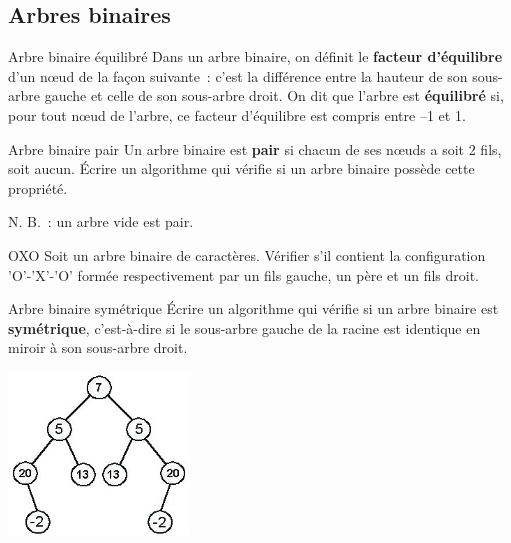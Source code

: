 	\subsection{Arbres binaires}

		\begin{Exercice}{Arbre binaire équilibré}
			Dans un arbre binaire, on définit le \textbf{facteur d'équilibre} 
			d'un n{\oe}ud de la façon suivante~: c'est la différence entre 
			la hauteur de son sous-arbre gauche et celle de son sous-arbre droit. 
			On dit que l'arbre est \textbf{équilibré} si, pour tout n{\oe}ud 
			de l'arbre, ce facteur d'équilibre est compris entre --1 et 1.
		\end{Exercice}
		
		\begin{Exercice}{Arbre binaire pair}
			Un arbre binaire est \textbf{pair} si chacun de ses n{\oe}uds 
			a soit 2 fils, soit aucun. Écrire un algorithme qui
			vérifie si un arbre binaire possède cette propriété. 
			
			N. B.~: un arbre vide est pair.
		\end{Exercice}
		
		\begin{Exercice}{OXO}
			Soit un arbre binaire de caractères. Vérifier s'il contient 
			la configuration 'O'-'X'-'O' formée respectivement par un
			fils gauche, un père et un fils droit.
		\end{Exercice}

		\begin{Exercice}{Arbre binaire symétrique}
			Écrire un algorithme qui vérifie si un arbre binaire est 
			\textbf{symétrique}, c'est-à-dire si le sous-arbre gauche de la
			racine est identique en miroir à son sous-arbre droit.

			\begin{center}
			\includegraphics[width=4.805cm,height=4.307cm]{image/a2012Logique2eme-img038.jpg}
			\end{center}
		\end{Exercice}
		
